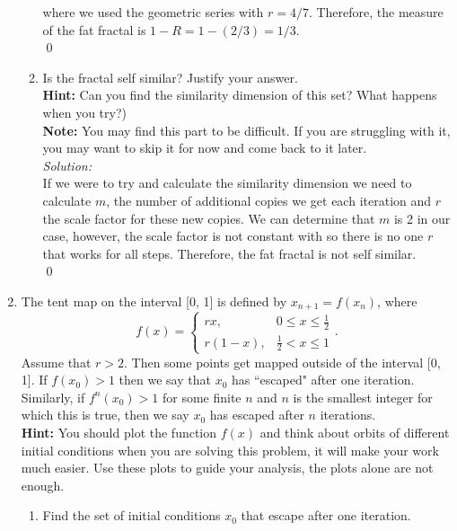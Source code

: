 \documentclass[10pt]{amsart}
\theoremstyle{nonumberplain}
\begin{document}
\begin{enumerate}[label={\bf {\arabic*}:}]
\begin{enumerate}
where we used the geometric series with $r = 4/7$.
Therefore, the measure of the fat fractal is $1 - R = 1 - (2/3) = 1/3$. \\
\qed \\

\item Is the fractal self similar?
Justify your answer. \\
\textbf{Hint:} Can you find the similarity dimension of this set?
What happens when you try?) \\
\textbf{Note:} You may find this part to be difficult.
If you are struggling with it, you may want to skip it for now and come back to it later. 
\\

\textit{Solution:} \\
If we were to try and calculate the similarity dimension we need to calculate $m$, the number of additional copies we get each iteration and $r$ the scale factor for these new copies.
We can determine that $m$ is 2 in our case, however, the scale factor is not constant with so there is no one $r$ that works for all steps.
Therefore, the fat fractal is not self similar. \\
\qed \\

\end{enumerate}
 
\newpage
 
\item The tent map on the interval [0, 1] is defined by $x_{n + 1} = f(x_n)$, where 
$$
f(x) = \begin{cases}
rx,  &0 \leq x \leq \frac 1 2 \\
r(1 - x), &\frac 1 2 < x \leq 1
\end{cases}.
$$
Assume that $r > 2$.
Then some points get mapped outside of the interval [0, 1].
If $f(x_0) > 1$ then we say that $x_0$ has ``escaped" after one iteration.
Similarly, if $f^n(x_0) > 1$ for some finite $n$ and $n$ is the smallest integer for which this is true, then we say $x_0$ has escaped after $n$ iterations. \\
\textbf{Hint:} You should plot the function $f (x)$ and think about orbits of different initial
conditions when you are solving this problem, it will make your work much easier.
Use these plots to guide your analysis, the plots alone are not enough. \\

\begin{enumerate}
\item Find the set of initial conditions $x_0$ that escape after one iteration. \\


\end{enumerate}
\end{enumerate}
\end{document}
